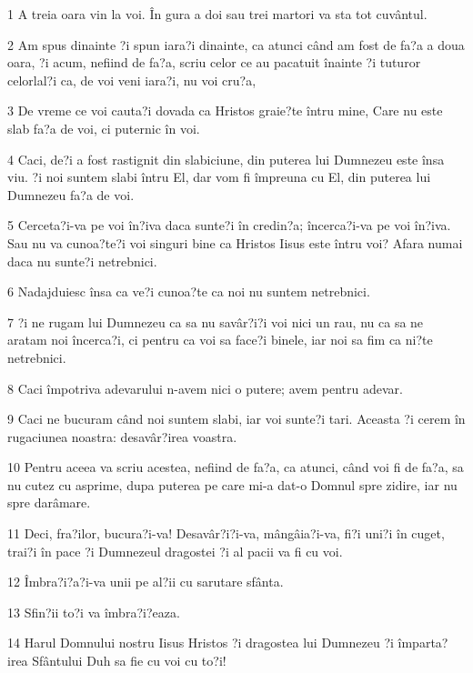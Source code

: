 \par 1 A treia oara vin la voi. În gura a doi sau trei martori va sta tot cuvântul.
\par 2 Am spus dinainte ?i spun iara?i dinainte, ca atunci când am fost de fa?a a doua oara, ?i acum, nefiind de fa?a, scriu celor ce au pacatuit înainte ?i tuturor celorlal?i ca, de voi veni iara?i, nu voi cru?a,
\par 3 De vreme ce voi cauta?i dovada ca Hristos graie?te întru mine, Care nu este slab fa?a de voi, ci puternic în voi.
\par 4 Caci, de?i a fost rastignit din slabiciune, din puterea lui Dumnezeu este însa viu. ?i noi suntem slabi întru El, dar vom fi împreuna cu El, din puterea lui Dumnezeu fa?a de voi.
\par 5 Cerceta?i-va pe voi în?iva daca sunte?i în credin?a; încerca?i-va pe voi în?iva. Sau nu va cunoa?te?i voi singuri bine ca Hristos Iisus este întru voi? Afara numai daca nu sunte?i netrebnici.
\par 6 Nadajduiesc însa ca ve?i cunoa?te ca noi nu suntem netrebnici.
\par 7 ?i ne rugam lui Dumnezeu ca sa nu savâr?i?i voi nici un rau, nu ca sa ne aratam noi încerca?i, ci pentru ca voi sa face?i binele, iar noi sa fim ca ni?te netrebnici.
\par 8 Caci împotriva adevarului n-avem nici o putere; avem pentru adevar.
\par 9 Caci ne bucuram când noi suntem slabi, iar voi sunte?i tari. Aceasta ?i cerem în rugaciunea noastra: desavâr?irea voastra.
\par 10 Pentru aceea va scriu acestea, nefiind de fa?a, ca atunci, când voi fi de fa?a, sa nu cutez cu asprime, dupa puterea pe care mi-a dat-o Domnul spre zidire, iar nu spre darâmare.
\par 11 Deci, fra?ilor, bucura?i-va! Desavâr?i?i-va, mângâia?i-va, fi?i uni?i în cuget, trai?i în pace ?i Dumnezeul dragostei ?i al pacii va fi cu voi.
\par 12 Îmbra?i?a?i-va unii pe al?ii cu sarutare sfânta.
\par 13 Sfin?ii to?i va îmbra?i?eaza.
\par 14 Harul Domnului nostru Iisus Hristos ?i dragostea lui Dumnezeu ?i împarta?irea Sfântului Duh sa fie cu voi cu to?i!


